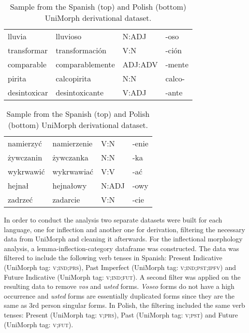 \documentclass[12pt]{article}
\begin{document}
\begin{table}[htbp]
    \footnotesize
    \centering
    \begin{tabular}{p{2.5cm}p{3cm}p{2.5cm}p{2.5cm}}
        \toprule
        lluvia   &      lluvioso   &  N:ADJ &   -oso \\
        transformar &  transformación &     V:N &   -ción\\
        comparable & comparablemente & ADJ:ADV &  -mente\\
        pirita &     calcopirita &     N:N &  calco-\\
        desintoxicar &  desintoxicante &   V:ADJ &   -ante\\
    \end{tabular}
    \begin{tabular}{p{2.5cm}p{3cm}p{2.5cm}p{2.5cm}}
        \midrule
        namierzyć  &     namierzenie     &  V:N &   -enie \\ 
        żywczanin  &       żywczanka     &  N:N &     -ka\\ 
        wykrwawić  &      wykrwawiać     &  V:V &     -ać\\ 
        hejnał     &   hejnałowy   &  N:ADJ   &   -owy\\ 
        zadrzeć    &     zadarcie     &  V:N   &  -cie\\ 
        \bottomrule
    \end{tabular}
    \caption{Sample from the Spanish (top) and Polish (bottom) UniMorph derivational dataset.}
    \label{tbl:unimorph-der}
\end{table}

In order to conduct the analysis two separate datasets were built for each language, one for inflection and another one for derivation, filtering the necessary data from UniMorph and cleaning it afterwards. For the inflectional morphology analysis, a lemma-inflection-category dataframe was constructed. The data was filtered to include the following verb tenses in Spanish: Present Indicative (UniMorph tag: \textsc{v;ind;prs}), Past Imperfect (UniMorph tag: \textsc{v;ind;pst;ipfv}) and Future Indicative (UniMorph tag: \textsc{v;ind;fut}). A second filter was applied on the resulting data to remove \textit{vos} and \textit{usted} forms. \textit{Voseo} forms do not have a high occurrence and \textit{usted} forms are essentially duplicated forms since they are the same as 3rd person singular forms. In Polish, the filtering included the same verb tenses: Present (UniMorph tag: \textsc{v;prs}), Past (UniMorph tag: \textsc{v;pst}) and Future (UniMorph tag: \textsc{v;fut}).
\end{document}
